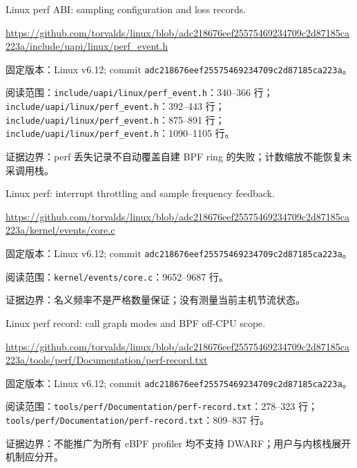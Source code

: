 \documentclass[UTF8,fontset=fandol,openany,11pt]{ctexbook}
\begin{document}
\begin{thebibliography}{999}
 Linux perf ABI: sampling configuration and loss records.\par
\url{https://github.com/torvalds/linux/blob/adc218676eef25575469234709c2d87185ca223a/include/uapi/linux/perf_event.h}\par
{\small\raggedright 固定版本：Linux v6.12; commit \texttt{adc21867\allowbreak{}6eef2557\allowbreak{}54692347\allowbreak{}09c2d871\allowbreak{}85ca223a}。\par
阅读范围：\nolinkurl{include/uapi/linux/perf_event.h}：340–366 行；\nolinkurl{include/uapi/linux/perf_event.h}：392–443 行；\nolinkurl{include/uapi/linux/perf_event.h}：875–891 行；\nolinkurl{include/uapi/linux/perf_event.h}：1090–1105 行。\par
证据边界：perf 丢失记录不自动覆盖自建 BPF ring 的失败；计数缩放不能恢复未采调用栈。
}

 Linux perf: interrupt throttling and sample frequency feedback.\par
\url{https://github.com/torvalds/linux/blob/adc218676eef25575469234709c2d87185ca223a/kernel/events/core.c}\par
{\small\raggedright 固定版本：Linux v6.12; commit \texttt{adc21867\allowbreak{}6eef2557\allowbreak{}54692347\allowbreak{}09c2d871\allowbreak{}85ca223a}。\par
阅读范围：\nolinkurl{kernel/events/core.c}：9652–9687 行。\par
证据边界：名义频率不是严格数量保证；没有测量当前主机节流状态。
}

 Linux perf record: call graph modes and BPF off-CPU scope.\par
\url{https://github.com/torvalds/linux/blob/adc218676eef25575469234709c2d87185ca223a/tools/perf/Documentation/perf-record.txt}\par
{\small\raggedright 固定版本：Linux v6.12; commit \texttt{adc21867\allowbreak{}6eef2557\allowbreak{}54692347\allowbreak{}09c2d871\allowbreak{}85ca223a}。\par
阅读范围：\nolinkurl{tools/perf/Documentation/perf-record.txt}：278–323 行；\nolinkurl{tools/perf/Documentation/perf-record.txt}：809–837 行。\par
证据边界：不能推广为所有 eBPF profiler 均不支持 DWARF；用户与内核栈展开机制应分开。
}


\end{thebibliography}
\end{document}
